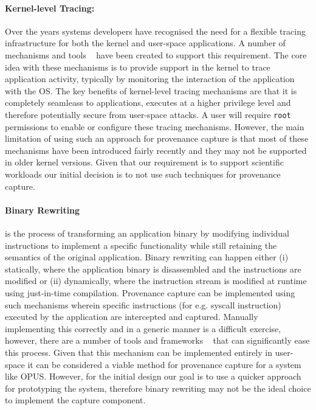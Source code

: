 \documentclass[withindex,glossary]{cam-thesis}
\begin{document}
\paragraph{Kernel-level Tracing:}
Over the years systems developers have recognised the need for a flexible tracing infrastructure for both the kernel and user-space applications.
A number of mechanisms and tools ~\cite{DTrace, SystemTap, Uprobes, LXCModules} have been created to support this requirement.
The core idea with these mechanisms is to provide support in the kernel to trace application activity, typically by monitoring the interaction of the application with the OS.
The key benefits of kernel-level tracing mechanisms are that it is completely seamleass to applications, executes at a higher privilege level and therefore potentially secure from user-space attacks.
A user will require \texttt{root} permissions to enable or configure these tracing mechanisms.
However, the main limitation of using such an approach for provenance capture is that most of these mechanisms have been introduced fairly recently and they may not be supported in older kernel versions.
Given that our requirement is to support scientific workloads our initial decision is to not use such techniques for provenance capture.


\paragraph{Binary Rewriting} is the process of transforming an application binary by modifying individual instructions to implement a specific functionality while still retaining the semantics of the original application. 
Binary rewriting can happen either (i) statically, where the application binary is disassembled and the instructions are modified or (ii) dynamically, where the instruction stream is modified at runtime using just-in-time compilation. 
Provenance capture can be implemented using such mechanisms wherein specific instructions (for e.g. syscall instruction) executed by the application are intercepted and captured.
Manually implementing this correctly and in a generic manner is a difficult exercise, however, there are a number of tools and frameworks ~\cite{PIN, DynInst} that can significantly ease this process.
Given that this mechanism can be implemented entirely in user-space it can be considered a viable method for provenance capture for a system like OPUS.
However, for the initial design our goal is to use a quicker approach for prototyping the system, therefore binary rewriting may not be the ideal choice to implement the capture component.
\end{document}

